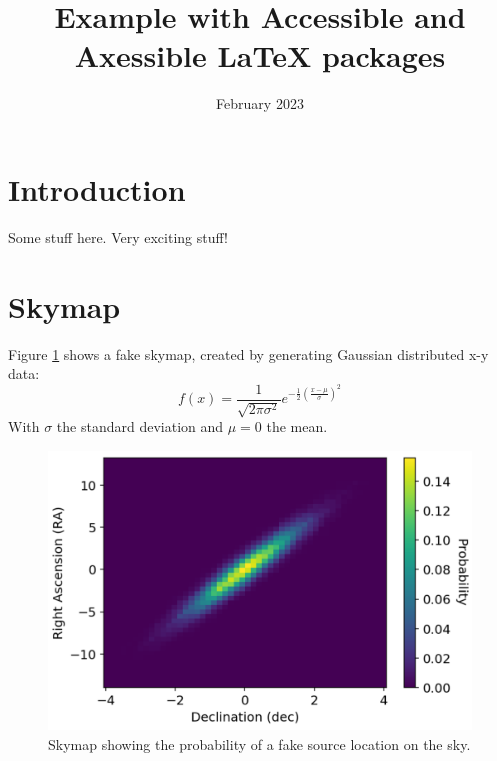 \documentclass{article}
\title{Example with Accessible and Axessible LaTeX packages}
\date{February 2023}
\begin{document}
\maketitle

\section{Introduction}
Some stuff here. Very exciting stuff!

\section{Skymap}
Figure \ref{fig:skymap} shows a fake skymap, created by generating Gaussian distributed x-y data:
\begin{equation}
    f(x) = \frac{1}{\sqrt{2 \pi \sigma^2}}e^{-\frac{1}{2}(\frac{x-\mu}{\sigma})^2}
\end{equation}
With $\sigma$ the standard deviation and $\mu=0$ the mean.

\begin{figure}
    \centering
    \includegraphics[width=\textwidth]{ex_map.png}
    \caption{Skymap showing the probability of a fake source location on the sky.}
    \label{fig:skymap}
\end{figure}
\end{document}
